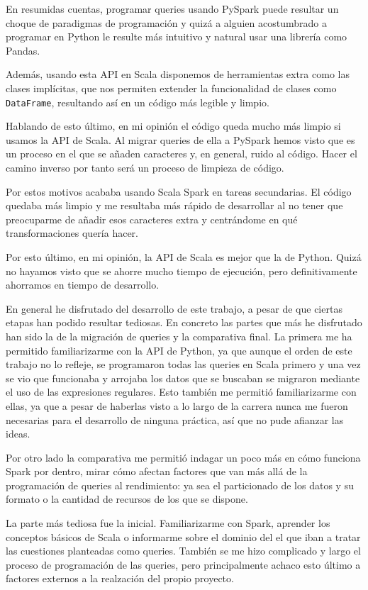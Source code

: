 \documentclass[12pt,twoside,titlepage]{report}
\begin{document}
En resumidas cuentas, programar queries usando PySpark puede resultar un choque de paradigmas de programación y quizá a alguien acostumbrado a programar en Python le resulte más intuitivo y natural usar una librería como Pandas.

Además, usando esta API en Scala disponemos de herramientas extra como las clases implícitas, que nos permiten extender la funcionalidad de clases como \texttt{DataFrame}, resultando así en un código más legible y limpio.

Hablando de esto último, en mi opinión el código queda mucho más limpio si usamos la API de Scala. Al migrar queries de ella a PySpark hemos visto que es un proceso en el que se añaden caracteres y, en general, ruido al código. Hacer el camino inverso por tanto será un proceso de limpieza de código.

Por estos motivos acababa usando Scala Spark en tareas secundarias. El código quedaba más limpio y me resultaba más rápido de desarrollar al no tener que preocuparme de añadir esos caracteres extra y centrándome en qué transformaciones quería hacer.

Por esto último, en mi opinión, la API de Scala es mejor que la de Python. Quizá no hayamos visto que se ahorre mucho tiempo de ejecución, pero definitivamente ahorramos en tiempo de desarrollo.

En general he disfrutado del desarrollo de este trabajo, a pesar de que ciertas etapas han podido resultar tediosas. En concreto las partes que más he disfrutado han sido la de la migración de queries y la comparativa final. La primera me ha permitido familiarizarme con la API de Python, ya que aunque el orden de este trabajo no lo refleje, se programaron todas las queries en Scala primero y una vez se vio que funcionaba y arrojaba los datos que se buscaban se migraron mediante el uso de las expresiones regulares. Esto también me permitió familiarizarme con ellas, ya que a pesar de haberlas visto a lo largo de la carrera nunca me fueron necesarias para el desarrollo de ninguna práctica, así que no pude afianzar las ideas.

Por otro lado la comparativa me permitió indagar un poco más en cómo funciona Spark por dentro, mirar cómo afectan factores que van más allá de la programación de queries al rendimiento: ya sea el particionado de los datos y su formato o la cantidad de recursos de los que se dispone.

La parte más tediosa fue la inicial. Familiarizarme con Spark, aprender los conceptos básicos de Scala o informarme sobre el dominio del el que iban a tratar las cuestiones planteadas como queries. También se me hizo complicado y largo el proceso de programación de las queries, pero principalmente achaco esto último a factores externos a la realzación del propio proyecto.
\end{document}
